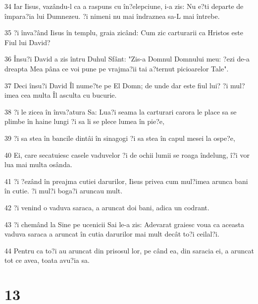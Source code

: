 \par 34 Iar Iisus, vazându-l ca a raspuns cu în?elepciune, i-a zis: Nu e?ti departe de împara?ia lui Dumnezeu. ?i nimeni nu mai îndraznea sa-L mai întrebe.
\par 35 ?i înva?ând Iisus în templu, graia zicând: Cum zic carturarii ca Hristos este Fiul lui David?
\par 36 Însu?i David a zis întru Duhul Sfânt: "Zis-a Domnul Domnului meu: ?ezi de-a dreapta Mea pâna ce voi pune pe vrajma?ii tai a?ternut picioarelor Tale".
\par 37 Deci însu?i David Îl nume?te pe El Domn; de unde dar este fiul lui? ?i mul?imea cea multa Îl asculta cu bucurie.
\par 38 ?i le zicea în înva?atura Sa: Lua?i seama la carturari carora le place sa se plimbe în haine lungi ?i sa li se plece lumea în pie?e,
\par 39 ?i sa stea în bancile dintâi în sinagogi ?i sa stea în capul mesei la ospe?e,
\par 40 Ei, care secatuiesc casele vaduvelor ?i de ochii lumii se roaga îndelung, î?i vor lua mai multa osânda.
\par 41 ?i ?ezând în preajma cutiei darurilor, Iisus privea cum mul?imea arunca bani în cutie. ?i mul?i boga?i aruncau mult.
\par 42 ?i venind o vaduva saraca, a aruncat doi bani, adica un codrant.
\par 43 ?i chemând la Sine pe ucenicii Sai le-a zis: Adevarat graiesc voua ca aceasta vaduva saraca a aruncat în cutia darurilor mai mult decât to?i ceilal?i.
\par 44 Pentru ca to?i au aruncat din prisosul lor, pe când ea, din saracia ei, a aruncat tot ce avea, toata avu?ia sa.

\chapter{13}

